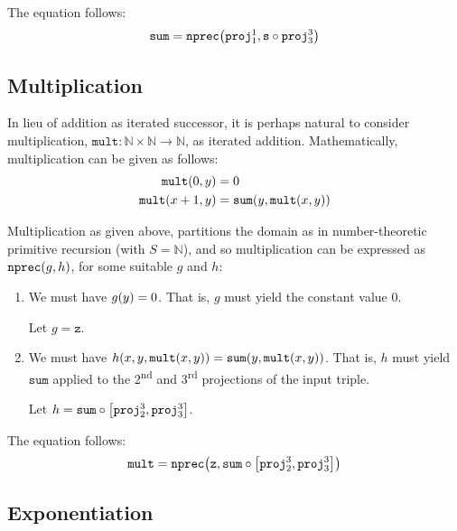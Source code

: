 The equation follows:\begin{align*}
%
\mathtt{sum} = \mathtt{nprec}\p{\mathtt{proj}^1_1, \mathtt{s} \circ
\mathtt{proj}^3_3}
%
\end{align*}

\subsection{Multiplication}

In lieu of addition as iterated successor, it is perhaps natural to consider
multiplication, $\mathtt{mult} : \mathbb{N} \times \mathbb{N} \rightarrow
\mathbb{N}$, as iterated addition. Mathematically, multiplication can be given
as follows:\begin{align*}
%
\mathtt{mult}\p{0, y} &= 0 \\
%
\mathtt{mult}\p{x+1,y} &= \mathtt{sum}\p{y, \mathtt{mult}\p{x,y}}
%
\end{align*}

Multiplication as given above, partitions the domain as in number-theoretic
primitive recursion (with $S = \mathbb{N}$), and so multiplication can be
expressed as $\mathtt{nprec}{\mathopen{}\left({g,h}\right)\mathclose{}}$, for some suitable $g$ and $h$:

\begin{enumerate}[label=(\arabic*)]

\item We must have $g{\mathopen{}\left({y}\right)\mathclose{}} = 0$. That is, $g$ must yield the constant value $0$.

Let $g = \mathtt{z}$.

\item We must have $h{\mathopen{}\left({x,y,\mathtt{mult}{\mathopen{}\left({x,y}\right)\mathclose{}}}\right)\mathclose{}} =
\mathtt{sum}{\mathopen{}\left({y,\mathtt{mult}{\mathopen{}\left({x,y}\right)\mathclose{}}}\right)\mathclose{}}$. That is, $h$ must yield $\mathtt{sum}$
applied to the 2\textsuperscript{nd} and 3\textsuperscript{rd} projections of
the input triple.

Let $h = \mathtt{sum} \circ \mathopen{}\left[{\mathtt{proj}^3_2, \mathtt{proj}^3_3}\right]\mathclose{}$.

\end{enumerate}

The equation follows:\begin{align*}
%
\mathtt{mult} = \mathtt{nprec}\p{\mathtt{z}, \mathtt{sum} \circ
\seq{\mathtt{proj}^3_2, \mathtt{proj}^3_3}}
%
\end{align*}

\subsection{Exponentiation}

